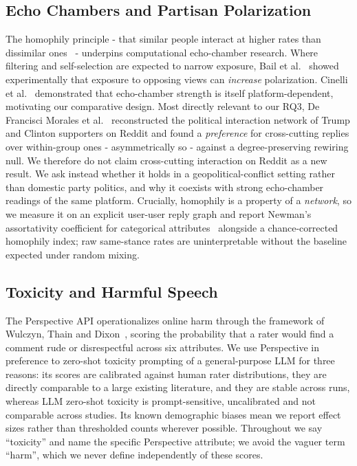 \documentclass[pdflatex,sn-basic,Numbered,iicol]{sn-jnl}
\begin{document}
\subsection{Echo Chambers and Partisan Polarization}
The homophily principle - that similar people interact at higher rates than
dissimilar ones~\cite{newman2003} - underpins computational echo-chamber
research. Where filtering and self-selection are expected to narrow exposure,
Bail et al.~\cite{bail2018} showed experimentally that
exposure to opposing views can \emph{increase} polarization. Cinelli
et al.~\cite{cinelli2021} demonstrated that echo-chamber strength is itself
platform-dependent, motivating our comparative design. Most directly relevant to
our RQ3, De Francisci Morales et al.~\cite{defrancisci2021} reconstructed the
political interaction network of Trump and Clinton supporters on Reddit and found a
\emph{preference} for cross-cutting replies over within-group ones - asymmetrically
so - against a degree-preserving rewiring null. We therefore do not claim
cross-cutting interaction on Reddit as a new result. We ask instead whether it holds
in a geopolitical-conflict setting rather than domestic party politics, and why it
coexists with strong echo-chamber readings of the same platform. Crucially, homophily is a
property of a \emph{network}, so we measure it on an explicit user-user reply graph
and report Newman's assortativity coefficient for categorical
attributes~\cite{newman2003} alongside a chance-corrected homophily index; raw
same-stance rates are uninterpretable without the baseline expected under random
mixing.

\subsection{Toxicity and Harmful Speech}
The Perspective API operationalizes online harm through the framework of Wulczyn,
Thain and Dixon~\cite{wulczyn2017}, scoring the probability that a rater would find a
comment rude or disrespectful across six attributes. We use Perspective in
preference to zero-shot toxicity prompting of a general-purpose LLM for three
reasons: its scores are calibrated against human rater distributions, they are
directly comparable to a large existing literature, and they are stable across runs,
whereas LLM zero-shot toxicity is prompt-sensitive, uncalibrated and not comparable
across studies. Its known demographic biases mean we report effect sizes rather than
thresholded counts wherever possible. Throughout we say ``toxicity'' and name the
specific Perspective attribute; we avoid the vaguer term ``harm'', which we never
define independently of these scores.
\end{document}

